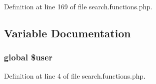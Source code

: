 Definition at line 169 of file search.functions.php.



\subsection{Variable Documentation}
\hypertarget{search_8functions_8php_a00365e6c5f70c43fb2ed86c9bc5626e0}{
\subsubsection[{\$user}]{\setlength{\rightskip}{0pt plus 5cm}global \$user}}
\label{search_8functions_8php_a00365e6c5f70c43fb2ed86c9bc5626e0}


Definition at line 4 of file search.functions.php.

